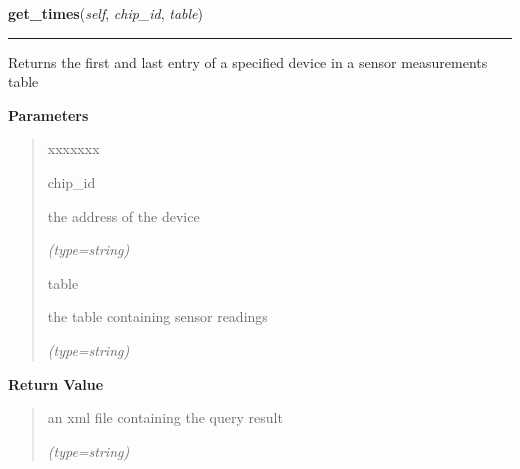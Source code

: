 \hspace{.8\funcindent}\begin{boxedminipage}{\funcwidth}

    \raggedright \textbf{get\_times}(\textit{self}, \textit{chip\_id}, \textit{table})

    \vspace{-1.5ex}

    \rule{\textwidth}{0.5\fboxrule}
\setlength{\parskip}{2ex}
    Returns the first and last entry of a specified device in a sensor 
    measurements table

\setlength{\parskip}{1ex}
      \textbf{Parameters}
      \vspace{-1ex}

      \begin{quote}
        \begin{Ventry}{xxxxxxx}

          \item[chip\_id]

          the address of the device

            {\it (type=string)}

          \item[table]

          the table containing sensor readings

            {\it (type=string)}

        \end{Ventry}

      \end{quote}

      \textbf{Return Value}
    \vspace{-1ex}

      \begin{quote}
      an xml file containing the query result

      {\it (type=string)}

      \end{quote}

    \end{boxedminipage}

    \label{DBE:DBE:get_groups}

    \vspace{0.5ex}

